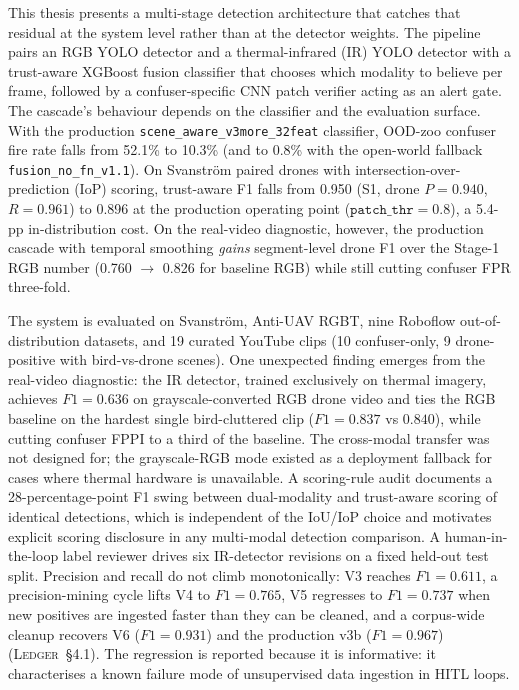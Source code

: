 \documentclass[12pt,a4paper,oneside,openright]{book}
\begin{document}
This thesis presents a multi-stage detection architecture that catches that residual at the system level rather than at the detector weights. The pipeline pairs an RGB YOLO detector and a thermal-infrared (IR) YOLO detector with a trust-aware XGBoost fusion classifier that chooses which modality to believe per frame, followed by a confuser-specific CNN patch verifier acting as an alert gate. The cascade's behaviour depends on the classifier and the evaluation surface. With the production \texttt{scene\_aware\_v3more\_32feat} classifier, OOD-zoo confuser fire rate falls from 52.1\% to 10.3\% (and to 0.8\% with the open-world fallback \texttt{fusion\_no\_fn\_v1.1}). On Svanstr\"om paired drones with intersection-over-prediction (IoP) scoring, trust-aware F1 falls from 0.950 (S1, drone $P=0.940$, $R=0.961$) to 0.896 at the production operating point ($\mathtt{patch\_thr}=0.8$), a 5.4-pp in-distribution cost. On the real-video diagnostic, however, the production cascade with temporal smoothing \emph{gains} segment-level drone F1 over the Stage-1 RGB number (0.760 $\to$ 0.826 for baseline RGB) while still cutting confuser FPR three-fold.

The system is evaluated on Svanstr\"om, Anti-UAV RGBT, nine Roboflow out-of-distribution datasets, and 19 curated YouTube clips (10 confuser-only, 9 drone-positive with bird-vs-drone scenes). One unexpected finding emerges from the real-video diagnostic: the IR detector, trained exclusively on thermal imagery, achieves $F1=0.636$ on grayscale-converted RGB drone video and ties the RGB baseline on the hardest single bird-cluttered clip ($F1=0.837$ vs $0.840$), while cutting confuser FPPI to a third of the baseline. The cross-modal transfer was not designed for; the grayscale-RGB mode existed as a deployment fallback for cases where thermal hardware is unavailable. A scoring-rule audit documents a 28-percentage-point F1 swing between dual-modality and trust-aware scoring of identical detections, which is independent of the IoU/IoP choice and motivates explicit scoring disclosure in any multi-modal detection comparison. A human-in-the-loop label reviewer drives six IR-detector revisions on a fixed held-out test split. Precision and recall do not climb monotonically: V3 reaches $F1=0.611$, a precision-mining cycle lifts V4 to $F1=0.765$, V5 regresses to $F1=0.737$ when new positives are ingested faster than they can be cleaned, and a corpus-wide cleanup recovers V6 ($F1=0.931$) and the production v3b ($F1=0.967$) (\textsc{Ledger}~\S4.1). The regression is reported because it is informative: it characterises a known failure mode of unsupervised data ingestion in HITL loops.
\end{document}
